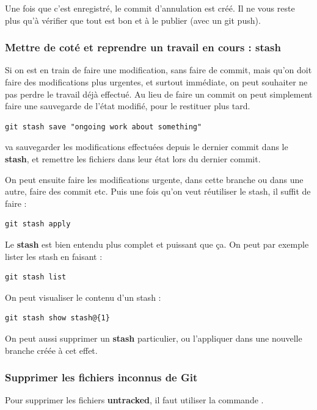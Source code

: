 \documentclass[a4paper,twoside]{article}
\begin{document}
Une fois que c'est enregistré, le commit d'annulation est créé. Il ne vous reste plus qu'à vérifier que tout est bon et à le publier (avec un git push).

\subsubsection{Mettre de coté et reprendre un travail en cours : stash}\label{sec:stash}
Si on est en train de faire une modification, sans faire de commit, mais qu'on doit faire des modifications plus urgentes, et surtout immédiate, on peut souhaiter ne pas perdre le travail déjà effectué. Au lieu de faire un commit on peut simplement faire une sauvegarde de l'état modifié, pour le restituer plus tard.

\begin{verbatim}
git stash save "ongoing work about something"
\end{verbatim}
va sauvegarder les modifications effectuées depuis le dernier commit dans le \textbf{stash}, et remettre les fichiers dans leur état lors du dernier commit. 

On peut ensuite faire les modifications urgente, dans cette branche ou dans une autre, faire des commit etc. Puis une fois qu'on veut réutiliser le stash, il suffit de faire : 
\begin{verbatim}
git stash apply
\end{verbatim}

\bigskip

Le \textbf{stash} est bien entendu plus complet et puissant que ça. On peut par exemple lister les stash en faisant :
\begin{verbatim}
git stash list
\end{verbatim}

On peut visualiser le contenu d'un stash : 
\begin{verbatim}
git stash show stash@{1}
\end{verbatim}

On peut aussi supprimer un \textbf{stash} particulier, ou l'appliquer dans une nouvelle branche créée à cet effet.

\subsubsection{Supprimer les fichiers inconnus de Git}
Pour supprimer les fichiers \textbf{untracked}, il faut utiliser la commande . 
\end{document}
